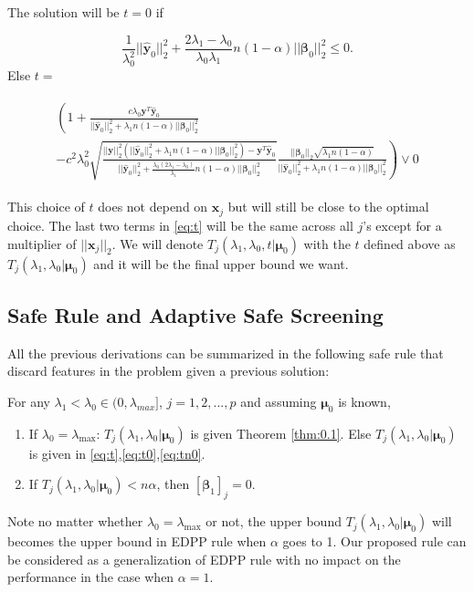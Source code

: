 The solution will be $t=0$ if

\begin{equation}
    \label{eq:t0}
    \frac{1}{\lambda_0^2}||\hat{\boldsymbol y}_{0}||_2^2+\frac{2\lambda_1-\lambda_0}{\lambda_0\lambda_1}n(1-\alpha)||\boldsymbol\beta_{0}||_2^2\leq 0.
\end{equation}
Else $t=$

\begin{gather}
    \label{eq:tn0}
    \begin{aligned}
        \left(1+\frac{c\lambda_0\boldsymbol y^T\hat{\boldsymbol y}_{0}}{||\hat{\boldsymbol y}_{0}||_2^2+\lambda_1n(1-\alpha)||\boldsymbol\beta_{0}||_2^2}\right.\\
        \left.-c^2\lambda_0^2\sqrt{\frac{||\boldsymbol y||_2^2\left(||\hat{\boldsymbol y}_{0}||_2^2+\lambda_1n(1-\alpha)||\boldsymbol\beta_{0}||_2^2\right)-\boldsymbol y^T\hat{\boldsymbol y}_{0}}{||\hat{\boldsymbol y}_{0}||_2^2+\frac{\lambda_0(2\lambda_1-\lambda_0)}{\lambda_1}n(1-\alpha)||\boldsymbol\beta_{0}||_2^2}}
        \frac{||\boldsymbol\beta_{0}||_2\sqrt{\lambda_1n(1-\alpha)}}{||\hat{\boldsymbol y}_{0}||_2^2+\lambda_1n(1-\alpha)||\boldsymbol\beta_{0}||_2^2}\right)\vee0
    \end{aligned}
\end{gather}

This choice of $t$ does not depend on $\boldsymbol x_j$ but will still be close to the optimal choice. The last two terms in \eqref{eq:t} will be the same across all $j$'s except for a multiplier of $||\boldsymbol x_j||_2$. We will denote $T_j(\lambda_1,\lambda_0,t|\boldsymbol\mu_0)$ with the $t$ defined above as $T_j(\lambda_1,\lambda_0|\boldsymbol\mu_0)$ and it will be the final upper bound we want.

\subsection{Safe Rule and Adaptive Safe Screening}

All the previous derivations can be summarized in the following safe rule that discard features in the problem given a previous solution:

\begin{theorem}
    \label{thm:rule}
    For any $\lambda_1<\lambda_{0}\in (0,\lambda_{max}]$, $j=1,2,...,p$ and assuming $\boldsymbol\mu_0$ is known,
    \begin{enumerate}
        \item If $\lambda_0=\lambda_{\max}$: $T_j(\lambda_1,\lambda_0|\boldsymbol\mu_0)$ is given Theorem \ref{thm:0.1}. Else $T_j(\lambda_1,\lambda_0|\boldsymbol\mu_0)$ is given in \eqref{eq:t},\eqref{eq:t0},\eqref{eq:tn0}.
        \item If $T_j(\lambda_1,\lambda_0|\boldsymbol\mu_0)<n\alpha$, then $[\boldsymbol\beta_{1}]_j=0$.
    \end{enumerate}
\end{theorem}
Note no matter whether $\lambda_0=\lambda_{\max}$ or not, the upper bound $T_j(\lambda_1,\lambda_0|\boldsymbol\mu_0)$ will becomes the upper bound in EDPP rule when $\alpha$ goes to 1. Our proposed rule can be considered as a generalization of EDPP rule with no impact on the performance in the case when $\alpha=1$.

